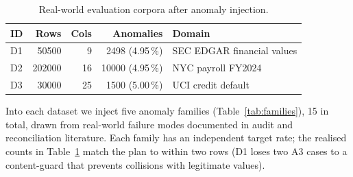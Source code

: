 \documentclass{ieeeaccess}
\begin{document}
\begin{table}[!htbp]
\centering
\small
\caption{Real-world evaluation corpora after anomaly injection.}
\label{tab:datasets}
\begin{tabular}{@{}lrrrl@{}}
\toprule
ID & Rows  & Cols & Anomalies & Domain \\
\midrule
D1 & \num{50500}  & 9  & \num{2498} (4.95\,\%) & SEC EDGAR financial values \\
D2 & \num{202000} & 16 & \num{10000} (4.95\,\%) & NYC payroll FY2024 \\
D3 & \num{30000}  & 25 & \num{1500} (5.00\,\%) & UCI credit default \\
\bottomrule
\end{tabular}
\end{table}

Into each dataset we inject five anomaly families (Table~\ref{tab:families}), 15 in total, drawn from
real-world failure modes documented in audit and reconciliation literature. Each family has an
independent target rate; the realised counts in Table~\ref{tab:datasets} match the plan to within
two rows (D1 loses two A3 cases to a content-guard that prevents collisions with legitimate values).
\end{document}
